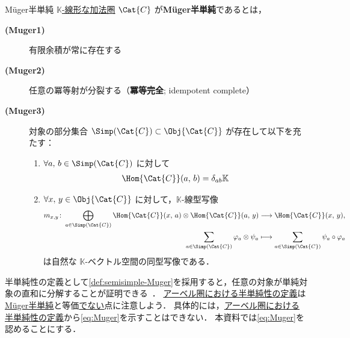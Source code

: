 \documentclass[TQFT_main]{subfiles}
\begin{document}
\begin{mydef}[label=def:semisimple-Muger,breakable]{M\"{u}ger半単純}
    \hyperref[def:additive-cat]{$\mathbb{K}$-線形な加法圏} $\Cat{C}$ が\textbf{M\"{u}ger半単純}であるとは，
    \begin{description}
        \item[\textbf{(Muger1)}] 有限余積が常に存在する
        \item[\textbf{(Muger2)}] 任意の冪等射が分裂する（\textbf{冪等完全}; idempotent complete）
        \item[\textbf{(Muger3)}] 対象の部分集合 $\Simp(\Cat{C}) \subset \Obj{\Cat{C}}$ が存在して以下を充たす：
        \begin{enumerate}
            \item $\forall a,\, b \in \Simp(\Cat{C})$ に対して
            \begin{align}
                \Hom{\Cat{C}}(a,\, b) = \delta_{ab}\mathbb{K}
            \end{align}
            \item $\forall x,\, y \in \Obj{\Cat{C}}$ に対して，$\mathbb{K}$-線型写像
            \begin{align}
                \label{eq:Muger}
                m_{x,y} \colon \bigoplus_{a \in \Simp(\Cat{C})}\Hom{\Cat{C}} (x,\, a) \otimes \Hom{\Cat{C}} (a,\, y) &\lto \Hom{\Cat{C}} (x,\, y), \\
                \sum_{a \in \Simp(\Cat{C})} \varphi_a \otimes \psi_a &\lmto \sum_{a \in \Simp(\Cat{C})} \psi_a \circ \varphi_a
            \end{align}
            は自然な $\mathbb{K}$-ベクトル空間の同型写像である．
        \end{enumerate}
    \end{description}
\end{mydef}

半単純性の定義として\ref{def:semisimple-Muger}を採用すると，任意の対象が単純対象の直和に分解することが証明できる~\cite[Proposition 28, p.7]{James2017semisimple}．
\hyperref[def:semisimple-cat]{アーベル圏における半単純性の定義}は\hyperref[def:semisimple-Muger]{M\"{u}ger半単純}と等価\underline{でない}点に注意しよう．
具体的には，\hyperref[def:semisimple-cat]{アーベル圏における半単純性の定義}から\eqref{eq:Muger}を示すことはできない．
本資料では\eqref{eq:Muger}を認めることにする．
\end{document}
